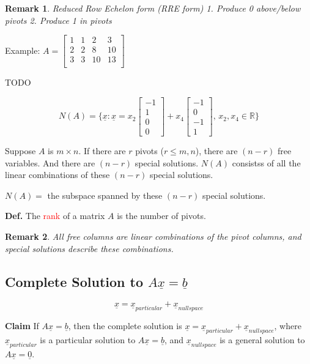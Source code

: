 \documentclass[12pt,a4paper]{article}
\newtheorem*{rem}{Remark}
\newcommand{\Remark}[1]{
  \begin{rem}
    \color{cyan}
    #1
  \end{rem}
}
\begin{document}
\Remark{Reduced Row Echelon form (RRE form) 1. Produce 0 above/below pivots 2. Produce 1 in pivots} 

Example:
$
A = 
\begin{bmatrix}
  1 & 1 & 2 & 3 \\
  2 & 2 & 8 & 10 \\
  3 & 3 & 10 & 13 \\
\end{bmatrix}
$

TODO

\[
  N(A) = \{ \underline{x}: \underline{x} = 
    x_2
    \begin{bmatrix}
      -1 \\
      1 \\
      0 \\
      0
    \end{bmatrix} + 
    x_4
    \begin{bmatrix}
      -1 \\
      0 \\
      -1 \\
      1
    \end{bmatrix},\, x_2, x_4 \in \mathbb{R}
  \} 
\]

Suppose $A$ is $m \times n$. If there are $r$ pivots ($r \leq m, n$),
there are $(n - r)$ free variables. And there are $(n - r)$ special solutions.
$N(A)$ consistss of all the linear combinations of these $(n-r)$ special solutions.

\begin{center}
  $N(A) =$ the subspace spanned by these $(n-r)$ special solutions.
\end{center}

\textbf{Def.} The \textcolor{red}{rank} of a matrix $A$ is the number of pivots.

\Remark{All free columns are linear combinations of the pivot columns, and special solutions describe these combinations.}

\subsection*{Complete Solution to $A\underline{x} = \underline{b}$}

\[ \underline{x} = \underline{x}_{particular} + \underline{x}_{nullspace} \]

\textbf{Claim} If $A\underline{x}=\underline{b}$, 
then the complete solution is $\underline{x} = \underline{x}_{particular} + \underline{x}_{nullspace}$, 
where $\underline{x}_{particular}$ is a particular solution to $A\underline{x}=\underline{b}$, and $\underline{x}_{nullspace}$ is a general solution to $A\underline{x} = \underline{0}$.
\end{document}
